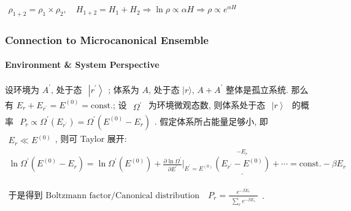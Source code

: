 \documentclass[../../main.tex]{subfiles}
\begin{document}
$\begin{aligned}
\rho_{1+2} = \rho_{1}\times \rho_{2}, \quad H_{1+2} = H_{1} + H_{2}\Rightarrow \ln{\rho}\propto \alpha H \Rightarrow \rho\propto e^{\alpha H}
\end{aligned}$

\subsubsection{Connection to Microcanonical Ensemble}

\paragraph{Environment \& System Perspective} 
设环境为 $A^{\prime}$, 处于态 $\begin{aligned}
    \left|r^{\prime}\right\rangle
\end{aligned}$; 体系为 $A$, 处于态 $|r\rangle$, $A+A^{\prime}$ 整体是孤立系统. 那么有 $E_{r}+E_{r^{\prime}} = E^{(0)}=\text{const.}$; 设 $\begin{aligned}
    \Omega^{\prime}
\end{aligned}$ 为环境微观态数, 则体系处于态 $\begin{aligned}
    \left|r\right\rangle
\end{aligned}$ 的概率 $\begin{aligned}
    P_{r} \propto \Omega^{\prime}(E_{r^{\prime}}) = \Omega^{\prime}(E^{(0)}-E_{r})
\end{aligned}$. 假定体系所占能量足够小, 即 $\begin{aligned}
    E_{r}\ll E^{(0)}
\end{aligned}$, 则可 Taylor 展开: $\begin{aligned}
    \ln{\Omega^{\prime}(E^{(0)}-E_{r})} = 
    \ln{\Omega^{\prime}(E^{(0)})} 
    + \frac{\partial \ln{\Omega^{\prime}}}{\partial E^{\prime}}\bigg|_{E^{\prime} = E^{(0)}}\stackrel{-E_{r}}{\underline{(E_{r^{\prime}}-E^{(0)})}}
    + \cdots 
    = \text{const.} - \beta E_{r}
\end{aligned}$

$\begin{aligned}
    \text{于是得到 Boltzmann factor/Canonical distribution}\quad  P_{r} = \frac{\begin{aligned}
        e^{-\beta E_{r}}
    \end{aligned}}{\begin{aligned}
        \sum_{r}e^{-\beta E_{r}}
    \end{aligned}}
\end{aligned}$.
\end{document}
